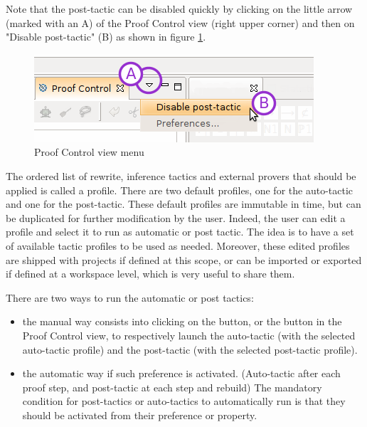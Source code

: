 Note that the post-tactic can be disabled quickly by clicking on the little arrow (marked with an A) of the \textsf{Proof Control view} (right upper corner) and then on "Disable post-tactic" (B) as shown in figure \ref{fig_ref_01_proving_perspective12}.

\begin{figure}[!h]
\begin{center}
	\includegraphics{img/reference/ref_01_proving_perspective12.png}
	\caption{Proof Control view menu}
	\label{fig_ref_01_proving_perspective12}
\end{center}
\end{figure}

The ordered list of rewrite, inference tactics and external provers that should be applied is called a profile. There are two default profiles, one for the auto-tactic and one for the post-tactic. These default profiles are immutable in time, but can be duplicated for further modification by the user. Indeed, the user can edit a profile and select it to run as automatic or post tactic. The idea is to have a set of available tactic profiles to be used as needed. Moreover, these edited profiles are shipped with projects if defined at this scope, or can be imported or exported if defined at a workspace level, which is very useful to share them.

There are two ways to run the automatic or post tactics:

\begin{itemize}
	\item the manual way consists into clicking on the  button, or the  button in the \textsf{Proof Control view}, to respectively launch the auto-tactic (with the selected auto-tactic profile) and the post-tactic (with the selected post-tactic profile).
	\item the automatic way if such preference is activated. (Auto-tactic after each proof step, and post-tactic at each step and rebuild) The mandatory condition for post-tactics or auto-tactics to automatically run is that they should be activated from their preference or property. 
\end{itemize}

